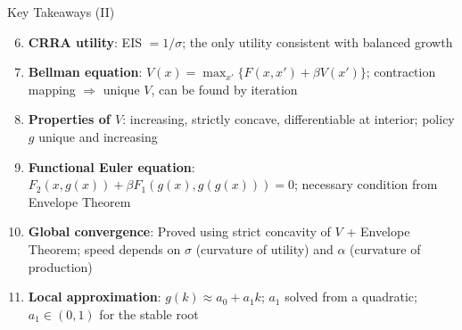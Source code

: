 \documentclass[blue]{beamer}
\begin{document}
\begin{frame}{Key Takeaways (II)}
	\begin{enumerate}
		\setcounter{enumi}{5}
		\item \textbf{CRRA utility}: EIS $= 1/\sigma$; the only utility consistent with balanced growth
		
		\item \textbf{Bellman equation}: $V(x) = \max_{x'}\{F(x,x') + \beta V(x')\}$; contraction mapping $\Rightarrow$ unique $V$, can be found by iteration
		
		\item \textbf{Properties of $V$}: increasing, strictly concave, differentiable at interior; policy $g$ unique and increasing
		
		\item \textbf{Functional Euler equation}: $F_2(x, g(x)) + \beta F_1(g(x), g(g(x))) = 0$; necessary condition from Envelope Theorem
		
		\item \textbf{Global convergence}: Proved using strict concavity of $V$ + Envelope Theorem; speed depends on $\sigma$ (curvature of utility) and $\alpha$ (curvature of production)
		
		\item \textbf{Local approximation}: $g(k) \approx a_0 + a_1 k$; $a_1$ solved from a quadratic; $a_1 \in (0,1)$ for the stable root
	\end{enumerate}
\end{frame}
\end{document}
